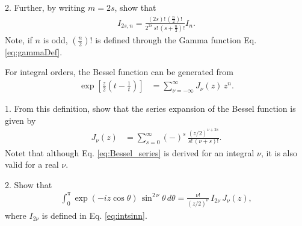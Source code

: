 \documentclass[12pt]{book}
\begin{document}
2. Further, by writing $m = 2s$, show that
\begin{align}
  I_{2s, n}
=
  \frac{(2s)! \, \left(\frac n 2\right)!}
  { 2^{2s} \, s! \, \left(s + \frac n 2\right)! }
  I_{n}.
  \label{eq:intcos2ssinn}
\end{align}
%
Note, if $n$ is odd, $\left(\frac n 2\right)!$
is defined through the Gamma function Eq. \eqref{eq:gammaDef}.






For integral orders, the Bessel function can be generated from
\begin{align*}
  \exp \left[ \frac{z}{2} \left(t - \frac 1 t \right) \right]
&=
  \sum_{\nu = -\infty}^\infty J_\nu(z) \, z^n.
\end{align*}

1. From this definition,
show that the series expansion of the Bessel function
is given by
\begin{align}
  J_\nu(z)
&=
  \sum_{s = 0}^\infty
  (-)^s \, \frac{ (z/2)^{\nu + 2 s} } { s! \, (\nu + s)! }.
  \label{eq:Bessel_series}
\end{align}
Notet that although Eq. \eqref{eq:Bessel_series}
is derived for an integral $\nu$,
it is also valid for a real $\nu$.



2. Show that
\begin{align}
  \int_0^\pi \exp( - i z \cos \theta) \, \sin^{2\,\nu} \theta \, d\theta
=
  \frac{ \nu! }{ (z/2)^\nu } \, I_{2\nu} \, J_\nu(z),
  \label{eq:intexpsin}
\end{align}
where $I_{2\nu}$ is defined in Eq. \eqref{eq:intsinn}.
\end{document}
